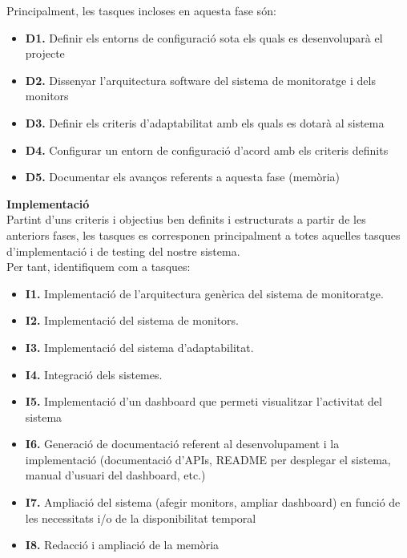 Principalment, les tasques incloses en aquesta fase són:

\begin{itemize}
\item \textbf{D1.} Definir els entorns de configuració sota els quals es desenvoluparà el projecte
\item \textbf{D2.} Dissenyar l’arquitectura software del sistema de monitoratge i dels monitors
\item \textbf{D3.} Definir els criteris d’adaptabilitat amb els quals es dotarà al sistema
\item \textbf{D4.} Configurar un entorn de configuració d’acord amb els criteris definits
\item \textbf{D5.} Documentar els avanços referents a aquesta fase (memòria)
\end{itemize}

\noindent \textbf{\large Implementació}\\

\noindent Partint d’uns criteris i objectius ben definits i estructurats a partir de les anteriors fases, les tasques es corresponen principalment a totes aquelles tasques d’implementació i de testing del nostre sistema. \\

Per tant, identifiquem com a tasques:

\begin{itemize}
\item \textbf{I1.} Implementació de l’arquitectura genèrica del sistema de monitoratge.
\item \textbf{I2.} Implementació del sistema de monitors.
\item \textbf{I3.} Implementació del sistema d'adaptabilitat.
\item \textbf{I4.} Integració dels sistemes.
\item \textbf{I5.} Implementació d’un dashboard que permeti visualitzar l’activitat del sistema
\item \textbf{I6.} Generació de documentació referent al desenvolupament i la implementació (documentació d’APIs, README per desplegar el sistema, manual d’usuari del dashboard, etc.)
\item \textbf{I7.} Ampliació del sistema (afegir monitors, ampliar dashboard) en funció de les necessitats i/o de la disponibilitat temporal
\item \textbf{I8.} Redacció i ampliació de la memòria
\end{itemize}

